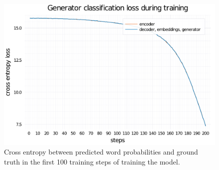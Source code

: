 \begin{figure}
    \centering
    \includegraphics[width=0.7\linewidth]{training-loss-transformer-abs-tiny.pdf}
    \caption{Cross entropy between predicted word probabilities and ground truth in the first 100 training steps of training the \TransformerAbsTiny model.}
    \label{training-loss-transformer-abs}
\end{figure}
